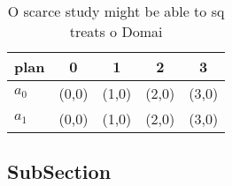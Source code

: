 \documentclass[a4paper]{article}
\begin{document}
\begin{table}
\begin{adjustbox}{width=0.7\columnwidth}
\begin{tabular}{|l|l|l|l|l|}
\hline
\textbf{plan} & \multicolumn{1}{c|}{\textbf{0}} & \multicolumn{1}{c|}{\textbf{1}} & \multicolumn{1}{c|}{\textbf{2}} & \multicolumn{1}{c|}{\textbf{3}} \\ \hline
\textbf{$a_0$}  & (0,0) & (1,0) & (2,0) & (3,0) \\ \hline
\textbf{$a_1$}  & (0,0) & (1,0) & (2,0) & (3,0) \\ \hline
\end{tabular}
\end{adjustbox}
\caption{O scarce study might be able to sq treats o Domai
}
\end{table}

\subsection{SubSection}
\end{document}
